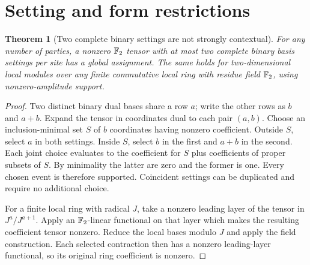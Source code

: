 \documentclass[11pt]{article}
\newtheorem{theorem}{Theorem}[section]
\theoremstyle{remark}
\begin{document}
\section{Setting and form restrictions}
\label{sec:settings}
\begin{theorem}[Two complete binary settings are not strongly contextual]
For any number of parties, a nonzero $\mathbb F_2$ tensor with at most two complete
binary basis settings per site has a global assignment. The same holds for
two-dimensional local modules over any finite commutative local ring with
residue field $\mathbb F_2$, using nonzero-amplitude support.
\end{theorem}
\begin{proof}
Two distinct binary dual bases share a row $a$; write the other rows as $b$
and $a+b$. Expand the tensor in coordinates dual to each pair $(a,b)$.
Choose an inclusion-minimal set $S$ of $b$ coordinates having nonzero coefficient.
Outside $S$, select $a$ in both settings. Inside $S$, select $b$ in the first
and $a+b$ in the second. Each joint choice evaluates to the coefficient for
$S$ plus coefficients of proper subsets of $S$. By minimality the latter are
zero and the former is one. Every chosen event is therefore supported.
Coincident settings can be duplicated and require no additional choice.

For a finite local ring with radical $J$, take a nonzero leading layer of the
tensor in $J^a/J^{a+1}$. Apply an $\mathbb F_2$-linear functional on that layer which
makes the resulting coefficient tensor nonzero. Reduce the local bases modulo
$J$ and apply the field construction. Each selected contraction then has a
nonzero leading-layer functional, so its original ring coefficient is nonzero.
\end{proof}
\end{document}

